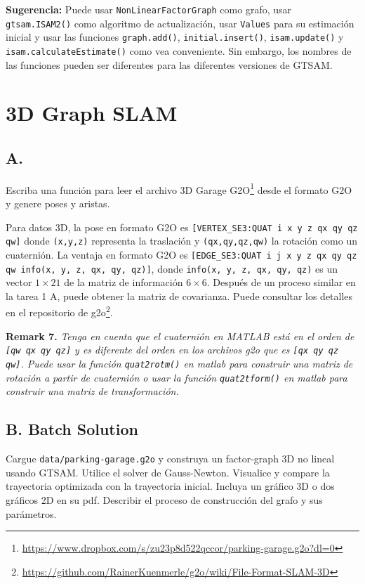 \documentclass[tp]{lcc}
\begin{document}
\textbf{Sugerencia:} Puede usar \lstinline[style=bash]{NonLinearFactorGraph} como grafo, usar \lstinline[style=bash]{gtsam.ISAM2()} como algoritmo de actualización, usar \lstinline[style=bash]{Values} para su estimación inicial y usar las funciones \lstinline[style=bash]{graph.add()}, \lstinline[style=bash]{initial.insert()}, \lstinline[style=bash]{isam.update()} y \lstinline[style=bash]{isam.calculateEstimate()} como vea conveniente. Sin embargo, los nombres de las funciones pueden ser diferentes para las diferentes versiones de GTSAM.

\section{3D Graph SLAM}
\subsection{A.}
Escriba una función para leer el archivo 3D Garage G2O\footnote{\url{https://www.dropbox.com/s/zu23p8d522qccor/parking-garage.g2o?dl=0}} desde el formato G2O y genere poses y aristas.

Para datos 3D, la pose en formato G2O es \lstinline[style=bash]{[VERTEX_SE3:QUAT i x y z qx qy qz qw]} donde \lstinline[style=bash]{(x,y,z)} representa la traslación y \lstinline[style=bash]{(qx,qy,qz,qw)} la rotación como un cuaternión. La ventaja en formato G2O es \lstinline[style=bash]{[EDGE_SE3:QUAT i j x y z qx qy qz qw info(x, y, z, qx, qy, qz)]}, donde \lstinline[style=bash]{info(x, y, z, qx, qy, qz)} es un vector $1 \times 21$ de la matriz de información $6 \times 6$. Después de un proceso similar en la tarea 1 A, puede obtener la matriz de covarianza. Puede consultar los detalles en el repositorio de g2o\footnote{\url{https://github.com/RainerKuenmerle/g2o/wiki/File-Format-SLAM-3D}}.

\textbf{Remark 7.} \textit{Tenga en cuenta que el cuaternión en MATLAB está en el orden de \lstinline[style=bash]{[qw qx qy qz]} y es diferente del orden en los archivos g2o que es \lstinline[style=bash]{[qx qy qz qw]}. Puede usar la función \lstinline[style=bash]{quat2rotm()} en matlab para construir una matriz de rotación a partir de cuaternión o usar la función \lstinline[style=bash]{quat2tform()} en matlab para construir una matriz de transformación.}

\subsection{B. Batch Solution}
Cargue \lstinline[style=bash]{data/parking-garage.g2o} y construya un factor-graph 3D no lineal usando GTSAM. Utilice el solver de Gauss-Newton. Visualice y compare la trayectoria optimizada con la trayectoria inicial. Incluya un gráfico 3D o dos gráficos 2D en su pdf. Describir el proceso de construcción del grafo y sus parámetros.
\end{document}
